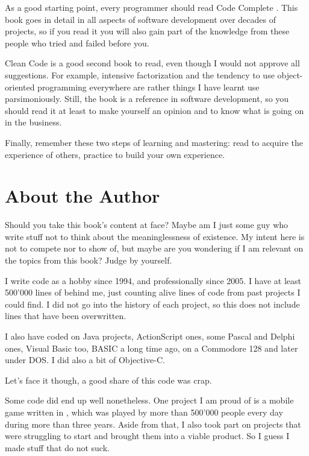 As a good starting point, every programmer should read Code Complete
\cite{code-complete}. This book goes in detail in all aspects of
software development over decades of projects, so if you read it you
will also gain part of the knowledge from these people who tried and
failed before you.

Clean Code \cite{clean-code} is a good second book to read, even
though I would not approve all suggestions. For example, intensive
factorization and the tendency to use object-oriented programming
everywhere are rather things I have learnt use parsimoniously. Still,
the book is a reference in software development, so you should read it
at least to make yourself an opinion and to know what is going on in
the business.

\bigskip

Finally, remember these two steps of learning and mastering: read to
acquire the experience of others, practice to build your own
experience.

\section{About the Author}

Should you take this book's content at face? Maybe am I just some guy
who write stuff not to think about the meaninglessness of
existence. My intent here is not to compete nor to show of, but maybe
are you wondering if I am relevant on the topics from this book? Judge
by yourself.

I write code as a hobby since 1994, and professionally since 2005. I
have at least 500'000 lines of \cpp{} behind me, just counting alive
lines of code from past projects I could find. I did not go into the
history of each project, so this does not include lines that have been
overwritten.

I also have coded on Java projects, ActionScript ones, some Pascal and
Delphi ones, Visual Basic too, BASIC a long time ago, on a Commodore
128 and later under DOS. I did also a bit of Objective-C.

Let's face it though, a good share of this code was crap.

Some code did end up well nonetheless. One project I am proud of is a
mobile game written in \cpp, which was played by more than 500'000
people every day during more than three years. Aside from that, I also
took part on projects that were struggling to start and brought them
into a viable product. So I guess I made stuff that do not suck.

